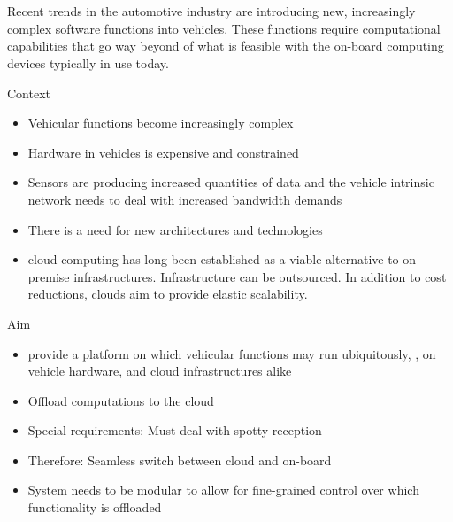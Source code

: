\chapter{\abstractname}

Recent trends in the automotive industry are introducing new, increasingly complex software functions into vehicles. These functions require computational capabilities that go way beyond of what is feasible with the on-board computing devices typically in use today.

Context
\begin{itemize}
\item Vehicular functions become increasingly complex
\item Hardware in vehicles is expensive and constrained
\item Sensors are producing increased quantities of data and the vehicle intrinsic network needs to deal with increased bandwidth demands
\item There is a need for new architectures and technologies
\item cloud computing has long been established as a viable alternative to on-premise infrastructures. Infrastructure can be outsourced. In addition to cost reductions, clouds aim to provide elastic scalability.
\end{itemize}

Aim
\begin{itemize}
\item provide a platform on which vehicular functions may run ubiquitously, \ie , on vehicle hardware, and cloud infrastructures alike
\item Offload computations to the cloud
\item Special requirements: Must deal with spotty reception
\item Therefore: Seamless switch between cloud and on-board
\item System needs to be modular to allow for fine-grained control over which functionality is offloaded
\end{itemize}

